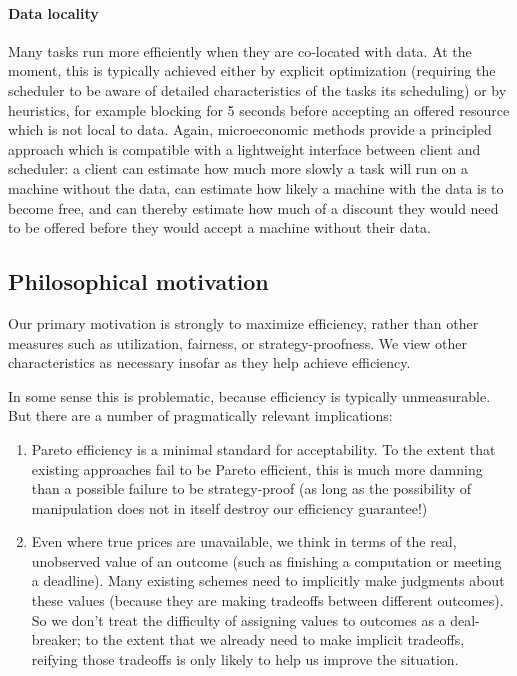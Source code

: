 \documentclass{acm_proc_article-sp}
\begin{document}
\paragraph{Data locality} Many tasks run more efficiently when they are
co-located with data. At the moment, this is typically achieved either by
explicit optimization (requiring the scheduler to be aware of detailed
characteristics of the tasks its scheduling) or by heuristics, for example
blocking for 5 seconds before accepting an offered resource which is not local
to data. Again, microeconomic methods provide a principled approach which is
compatible with a lightweight interface between client and scheduler: a client
can estimate how much more slowly a task will run on a machine without the data,
can estimate how likely a machine with the data is to become free, and can
thereby estimate how much of a discount they would need to be offered before
they would accept a machine without their data.

\subsection{Philosophical motivation}
Our primary motivation is strongly to maximize efficiency, rather than other
measures such as utilization, fairness, or strategy-proofness. We view other
characteristics as necessary insofar as they help achieve efficiency. 

In some sense this is problematic, because efficiency is typically unmeasurable.
But there are a number of pragmatically relevant implications:
\begin{enumerate}
  \item Pareto efficiency is a minimal standard for acceptability. To the extent
    that existing approaches fail to be Pareto efficient, this is much more
    damning than a possible failure to be strategy-proof (as long as the
    possibility of manipulation does not in itself destroy our efficiency
    guarantee!)
  \item Even where true prices are unavailable, we think in terms of the real,
    unobserved value of an outcome (such as finishing a computation or meeting a
    deadline). Many existing schemes need to implicitly make judgments about
    these values (because they are making tradeoffs between different outcomes).
    So we don't treat the difficulty of assigning values to outcomes as a
    deal-breaker; to the extent that we already need to make implicit tradeoffs,
    reifying those tradeoffs is only likely to help us improve the situation.
\end{enumerate}
\end{document}

